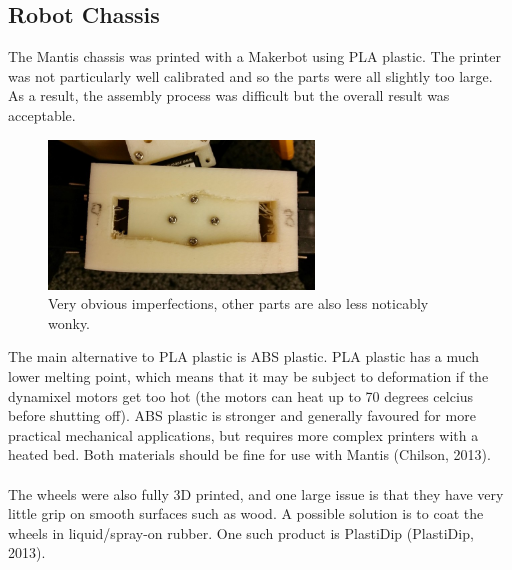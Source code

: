 \documentclass[]{article}
\begin{document}
\subsection{Robot Chassis}
The Mantis chassis was printed with a Makerbot using PLA plastic. The printer was not particularly well calibrated and so the parts were all slightly too large. As a result, the assembly process was difficult but the overall result was acceptable.
\begin{figure}[H]
\centering
\includegraphics[width=200pt]{report_images/plastic_imperfection.jpg}
\caption{Very obvious imperfections, other parts are also less noticably wonky.}
\end{figure}
The main alternative to PLA plastic is ABS plastic. PLA plastic has a much lower melting point, which means that it may be subject to deformation if the dynamixel motors get too hot (the motors can heat up to 70 degrees celcius before shutting off). ABS plastic is stronger and generally favoured for more practical mechanical applications, but requires more complex printers with a heated bed. Both materials should be fine for use with Mantis (Chilson, 2013).
\\
\\
The wheels were also fully 3D printed, and one large issue is that they have very little grip on smooth surfaces such as wood. A possible solution is to coat the wheels in liquid/spray-on rubber. One such product is PlastiDip (PlastiDip, 2013).
\end{document}
